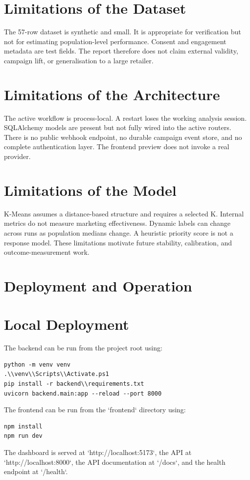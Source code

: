 \documentclass[12pt,a4paper]{report}
\begin{document}
\section{Limitations of the Dataset}
The 57-row dataset is synthetic and small. It is appropriate for verification but not for estimating population-level performance. Consent and engagement metadata are test fields. The report therefore does not claim external validity, campaign lift, or generalisation to a large retailer.

\section{Limitations of the Architecture}
The active workflow is process-local. A restart loses the working analysis session. SQLAlchemy models are present but not fully wired into the active routers. There is no public webhook endpoint, no durable campaign event store, and no complete authentication layer. The frontend preview does not invoke a real provider.

\section{Limitations of the Model}
K-Means assumes a distance-based structure and requires a selected K. Internal metrics do not measure marketing effectiveness. Dynamic labels can change across runs as population medians change. A heuristic priority score is not a response model. These limitations motivate future stability, calibration, and outcome-measurement work.

\section{Deployment and Operation}
\section{Local Deployment}
The backend can be run from the project root using:
\begin{lstlisting}
python -m venv venv
.\\venv\\Scripts\\Activate.ps1
pip install -r backend\\requirements.txt
uvicorn backend.main:app --reload --port 8000
\end{lstlisting}
The frontend can be run from the `frontend` directory using:
\begin{lstlisting}
npm install
npm run dev
\end{lstlisting}
The dashboard is served at `http://localhost:5173`, the API at `http://localhost:8000`, the API documentation at `/docs`, and the health endpoint at `/health`.
\end{document}
